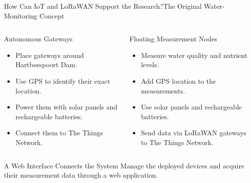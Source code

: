 \begin{frame}{How Can IoT and LoRaWAN Support the Research?}{The Original Water-Monitoring Concept}
\begin{columns}[T,onlytextwidth]
\begin{block}{Autonomous Gateways}
\begin{itemize}
\item Place gateways around Hartbeespoort Dam.
\item Use GPS to identify their exact location.
\item Power them with solar panels and rechargeable batteries.
\item Connect them to The Things Network.
\end{itemize}
\end{block}
\begin{block}{Floating Measurement Nodes}
\begin{itemize}
\item Measure water quality and nutrient levels.
\item Add GPS location to the measurements.
\item Use solar panels and rechargeable batteries.
\item Send data via LoRaWAN gateways to The Things Network.
\end{itemize}
\end{block}
\end{columns}
\begin{alertblock}{A Web Interface Connects the System}
Manage the deployed devices and acquire their measurement data through a web application.
\end{alertblock}
\end{frame}
